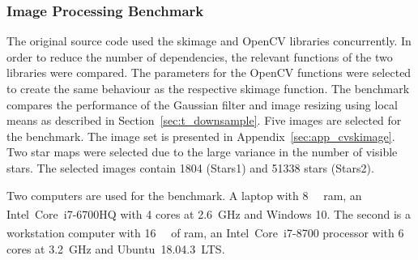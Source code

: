 \begin{table}[htb]
    \centering
    \caption{Summary of two profiles obtained while executing a complete run of \gls{sispo}, i.e. rendering, compression and reconstruction. More than \SI{90}{\percent} of total time is spent rendering images. Values are rounded to one decimal precision.}
    \label{tab:profiles}
\end{table}

\subsubsection{Image Processing Benchmark} \label{sec:cvskimage}
The original source code used the \gls{skimage} and OpenCV libraries concurrently. In order to reduce the number of dependencies, the relevant functions of the two libraries were compared. The parameters for the OpenCV functions were selected to create the same behaviour as the respective \gls{skimage} function. The benchmark compares the performance of the Gaussian filter and image resizing using local means as described in Section~\ref{sec:t_downsample}. Five images are selected for the benchmark. The image set is presented in Appendix~\ref{sec:app_cvskimage}. Two star maps were selected due to the large variance in the number of visible stars. The selected images contain 1804 (Stars1) and 51338 stars (Stars2).

Two computers are used for the benchmark. A laptop with \SI{8}{\giga\byte} \gls{ram}, an Intel\textsuperscript{\textregistered}~Core\texttrademark~i7-6700HQ with \SI{4}{} cores at \SI{2.6}{\giga\hertz} and Windows 10. The second is a workstation computer with \SI{16}{\giga\byte} of \gls{ram}, an Intel\textsuperscript{\textregistered}~Core\texttrademark~i7-8700 processor with \SI{6}{} cores at \SI{3.2}{\giga\hertz} and Ubuntu~18.04.3~LTS.

